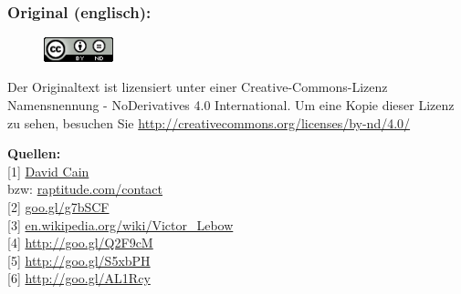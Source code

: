 \subsubsection*{Original (englisch):}

\begin{figure}
\includegraphics[width=2cm]{trillions/ccbynd88x31.png}
\end{figure}
Der Originaltext ist lizensiert unter einer Creative-Commons-Lizenz Namensnennung - NoDerivatives 4.0 International. Um eine Kopie dieser Lizenz zu sehen, besuchen Sie \url{http://creativecommons.org/licenses/by-nd/4.0/}


\textbf{Quellen:} \\
{[}1{]} \href{https://twitter.com/DavidDCain}{David Cain} \\
bzw: \href{http://www.raptitude.com/contact/}{raptitude.com/contact} \\
{[}2{]} \href{http://www.raptitude.com/2011/01/how-to-make-trillions-of-dollars/}{goo.gl/g7bSCF} \\
{[}3{]} \href{https://en.wikipedia.org/wiki/Victor\_Lebow}{en.wikipedia.org/wiki/Victor\_Lebow} \\
{[}4{]} \href{http://www.raptitude.com/2010/10/being-healthy-is-not-normal/}{http://goo.gl/Q2F9cM} \\
{[}5{]} \href{http://www.raptitude.com/2011/01/i-dont-want-stuff-any-more-only-things/}{http://goo.gl/S5xbPH} \\
{[}6{]} \href{http://www.raptitude.com/2010/07/your-lifestyle-has-already-been-designed/}{http://goo.gl/AL1Rcy} 


